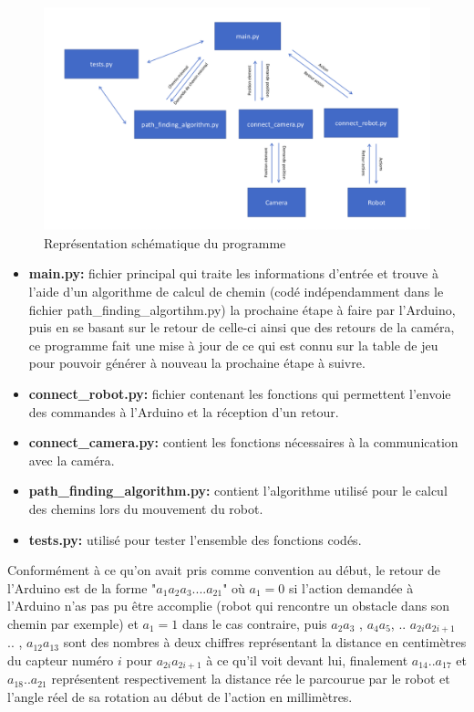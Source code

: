 \documentclass{article}
\begin{document}
\begin{figure}[h!]
\centering
\includegraphics[scale=0.3]{program}
\caption{Représentation schématique du programme}
\label{fig:program}
\end{figure}

{\renewcommand\labelitemi{-}
\begin{itemize}
\itemsep0em
\item \textbf{main.py:} fichier principal qui traite les informations d'entrée et trouve à l'aide d'un algorithme de calcul de chemin (codé indépendamment dans le fichier path\_finding\_algortihm.py) la prochaine étape à faire par l'Arduino, puis en se basant sur le retour de celle-ci ainsi que des retours de la caméra, ce programme fait une mise à jour de ce qui est connu sur la table de jeu pour pouvoir générer à nouveau la prochaine étape à suivre.\\
\item \textbf{connect\_robot.py:} fichier contenant les fonctions qui permettent l'envoie des commandes à l'Arduino et la réception d'un retour.\\
\item \textbf{connect\_camera.py:} contient les fonctions nécessaires à la communication avec la caméra.\\
\item \textbf{path\_finding\_algorithm.py:} contient l'algorithme utilisé pour le calcul des chemins lors du mouvement du robot.\\
\item \textbf{tests.py:} utilisé pour tester l'ensemble des fonctions codés.
\end{itemize}
}

Conformément à ce qu'on avait pris comme convention au début, le retour de l'Arduino est de la forme "$a_{1}a_{2}a_{3}....a_{21}$" où $a_{1} = 0$ si l'action demandée à l'Arduino n'as pas pu être accomplie (robot qui rencontre un obstacle dans son chemin par exemple) et $a_{1} = 1$ dans le cas contraire, puis $a_{2}a_{3}$ , $a_{4}a_{5}$, .. $a_{2i}a_{2i+1}$ .. , $a_{12}a_{13}$ sont des nombres à deux chiffres représentant la distance en centimètres du capteur numéro $i$ pour $a_{2i}a_{2i+1}$ à ce qu'il voit devant lui, finalement $a_{14}..a_{17}$ et  $a_{18}..a_{21}$ représentent respectivement la distance rée le parcourue par le robot et l'angle réel de sa rotation au début de l'action en millimètres.
\end{document}
